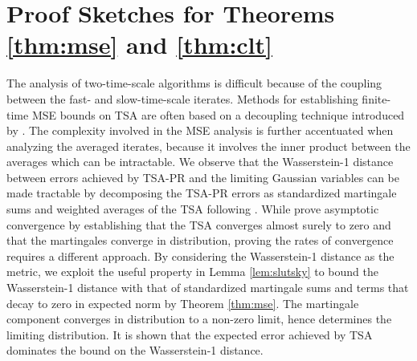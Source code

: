 \section{Proof Sketches for Theorems \ref{thm:mse} and \ref{thm:clt}}
The analysis of two-time-scale algorithms is difficult because of the coupling between the fast- and slow-time-scale iterates.
Methods for establishing finite-time MSE bounds on TSA are often based on a decoupling technique introduced by \citet{konda2004convergence}. 
The complexity involved in the MSE analysis is further accentuated when analyzing the averaged iterates, because it involves the inner product between the averages which can be intractable. 
We observe that the Wasserstein-1 distance between errors achieved by TSA-PR and the limiting Gaussian variables can be made tractable by decomposing the TSA-PR errors as standardized martingale sums and weighted averages of the TSA following \citep{mokkadem2006convergence}. 
While \citet{mokkadem2006convergence} prove asymptotic convergence by establishing that the TSA converges almost surely to zero and that the martingales converge in distribution, proving the rates of convergence requires a different approach. 
By considering the Wasserstein-1 distance as the metric, we exploit the useful property in Lemma \ref{lem:slutsky} to bound the Wasserstein-1 distance with that of standardized martingale sums and terms that decay to zero in expected norm by Theorem \ref{thm:mse}. 
The martingale component converges in distribution to a non-zero limit, hence determines the limiting distribution.
It is shown that the expected error achieved by TSA dominates the bound on the Wasserstein-1 distance.


